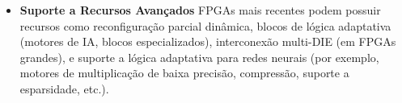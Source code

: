 \begin{itemize}
	\item \textbf{Suporte a Recursos Avançados}
	FPGAs mais recentes podem possuir recursos como reconfiguração parcial dinâmica, blocos de lógica adaptativa (motores de IA, blocos especializados), interconexão multi-DIE (em FPGAs grandes), e suporte a lógica adaptativa para redes neurais (por exemplo, motores de multiplicação de baixa precisão, compressão, suporte a esparsidade, etc.).
\end{itemize}


%
%
%
